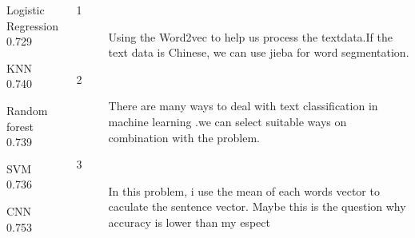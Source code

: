 \documentclass{tikzposter} %
\begin{document}
\begin{columns}
{\begin{description}
  \item  Logistic Regression 0.729
      \item  KNN 0.740
      \item  Random forest 0.739
      \item  SVM 0.736
      \item  CNN 0.753
\end{description}
}

{
  \begin{description}
  \item[1] Using the Word2vec to help us process the textdata.If the text data is Chinese, we can use jieba for word segmentation.
  \item[2] There are many ways to deal with text classification in machine learning .we can select suitable ways on combination with the problem.
  \item[3] In this problem, i use the mean of each words vector to caculate the sentence vector. Maybe this is the question why accuracy is lower than my espect  
  \end{description}
}





\end{columns}
\end{document}
